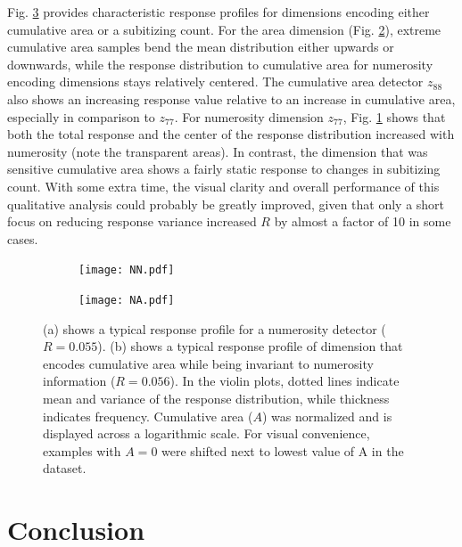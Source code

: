 \documentclass[twocolumn]{article}
\begin{document}
Fig. \ref{fig:linear}  provides characteristic response profiles for dimensions
encoding either cumulative area or a subitizing count. For the area
dimension (Fig. \ref{fig:za}), extreme cumulative area samples bend the mean distribution
either upwards or downwards, while the response distribution to
cumulative area for numerosity encoding dimensions stays relatively
centered. The cumulative area detector \(z_{88}\) also shows an increasing response value relative to an increase in cumulative area, especially in comparison to \(z_{77}\). For numerosity dimension \(z_{77}\), Fig. \ref{fig:zn} shows that both the total response and the center of the response distribution increased with
numerosity (note the transparent areas). In contrast, the dimension that was sensitive cumulative area shows a fairly
static response to changes in subitizing count. With some extra time,
the visual clarity and overall performance of this qualitative analysis
could probably be greatly improved, given that only a short focus on
reducing response variance increased \(R\) by almost a factor of 10 in
some cases.

\begin{figure}[ht]
\centering
\begin{subfigure}{.5\textwidth}
  \centering
  \texttt{[image: NN.pdf]}
  \caption{}
  \label{fig:zn}
\end{subfigure}%
\begin{subfigure}{.5\textwidth}
  \centering
  \texttt{[image: NA.pdf]}
   \caption{}
  \label{fig:za}
\end{subfigure}
\caption{(a) shows a typical response profile for a numerosity detector ($R=0.055$).  (b) shows a typical response profile of dimension that encodes cumulative area while being invariant to numerosity information ($R=0.056$). In the violin plots, dotted lines indicate mean and variance of the response distribution, while thickness indicates frequency. Cumulative area ($A$) was normalized and is displayed across a logarithmic scale. For visual convenience, examples with $A=0$ were shifted next to lowest value of A in the dataset.}
\label{fig:linear}
\end{figure}

\hypertarget{conclusion}{%
\section{Conclusion}\label{conclusion}}
\end{document}
